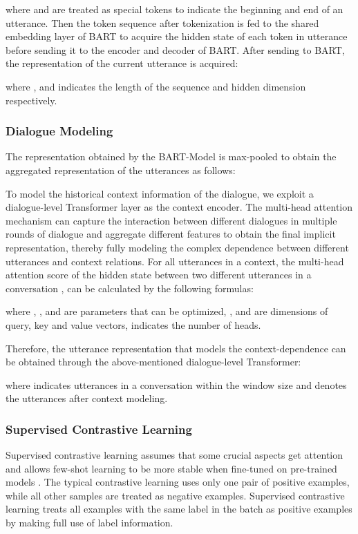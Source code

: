 \documentclass[letterpaper]{article} \usepackage{aaai22}  \usepackage{times}  \usepackage{helvet}  \usepackage{courier}  \usepackage[hyphens]{url}  \usepackage{graphicx} \urlstyle{rm} \def\UrlFont{\rm}  \usepackage{natbib}  \usepackage{caption} \DeclareCaptionStyle{ruled}{labelfont=normalfont,labelsep=colon,strut=off} \frenchspacing  \setlength{\pdfpagewidth}{8.5in}  \setlength{\pdfpageheight}{11in}  \usepackage{algorithm}
\begin{document}
\noindent where  and  are treated as special tokens to indicate the beginning and end of an utterance.
Then the token sequence after tokenization is fed to the shared embedding layer of BART to acquire the hidden state of each token in utterance before sending it to the encoder and decoder of BART. After sending  to BART, the representation of the current utterance  is acquired:


\noindent where , and  indicates the length of the sequence and hidden dimension respectively.

\subsubsection{Dialogue Modeling}

The representation  obtained by the BART-Model is max-pooled to obtain the aggregated representation of the utterances as follows:




To model the historical context information of the dialogue, we exploit a dialogue-level Transformer \cite{transformer-nips-2017} layer as the context encoder. The multi-head attention mechanism can capture the interaction between different dialogues in multiple rounds of dialogue and aggregate different features to obtain the final implicit representation, thereby fully modeling the complex dependence between different utterances and context relations. For all utterances in a context, the multi-head attention score of the hidden state between two different utterances in a conversation ,  can be calculated by the following formulas:



\noindent where , ,  and  are parameters that can be optimized, ,  and  are dimensions of query, key and value vectors,  indicates the number of heads.

Therefore, the utterance representation that models the context-dependence can be obtained through the above-mentioned dialogue-level Transformer:


\noindent where  indicates utterances in a conversation within the window size  and  denotes the utterances after context modeling.


\subsubsection{Supervised Contrastive Learning}

Supervised contrastive learning assumes that some crucial aspects get attention and allows few-shot learning to be more stable when fine-tuned on pre-trained models \cite{scl-fine-tune}.
The typical contrastive learning uses only one pair of positive examples, while all other samples are treated as negative examples. Supervised contrastive learning treats all examples with the same label in the batch as positive examples by making full use of label information.
\end{document}
